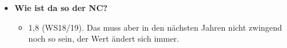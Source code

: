 \begin{large}
\begin{itemize}
	\item \textbf{Wie ist da so der NC?}
	\begin{itemize}
		\item 1,8 (WS18/19). Das muss aber in den nächsten Jahren nicht zwingend noch so sein, der Wert ändert sich immer.
	\end{itemize}
\end{itemize}


\end{large}